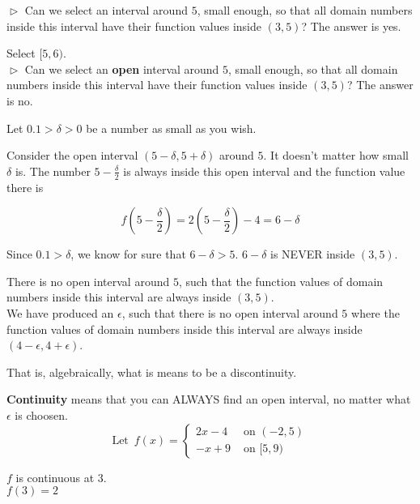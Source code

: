 \documentclass{ximera}
\begin{document}
\begin{example}
$\vartriangleright$ Can we select an interval around $5$, small enough, so that all domain numbers inside this interval have their function values inside $(3,5)$?  The answer is yes.

Select $[5, 6)$. \\



$\vartriangleright$ Can we select an \textbf{open} interval around $5$, small enough, so that all domain numbers inside this interval have their function values inside $(3,5)$?  The answer is no.




Let $0.1 > \delta > 0$ be a number as small as you wish.

Consider the open interval $(5-\delta, 5+\delta)$ around $5$. It doesn't matter how small $\delta$ is.  The number $5 - \frac{\delta}{2}$ is always inside this open interval and the function value there is 

\[  f(5 - \frac{\delta}{2})     = 2(5 - \frac{\delta}{2})-4 = 6 - \delta     \]


Since $0.1 > \delta$, we know for sure that $6 - \delta > 5$.  $6 - \delta$ is NEVER inside $(3, 5)$.

There is no open interval around $5$, such that the function values of domain numbers inside this interval are always inside $(3,5)$. \\




We have produced an $\epsilon$, such that there is no open interval around $5$ where the function values of domain numbers inside this interval are always inside $(4-\epsilon , 4+\epsilon)$.


That is, algebraically, what is means to be a discontinuity.




\end{example}




\textbf{Continuity} means that you can ALWAYS find an open interval, no matter what $\epsilon$ is choosen. \\






\[
\text{Let } \, f(x) = 
\begin{cases}
  2x-4 & \text{ on } (-2, 5) \\
  -x + 9  & \text{ on } [5, 9)
\end{cases}
\]

$f$ is continuous at $3$. \\
$f(3)=2$ \\
\end{document}
